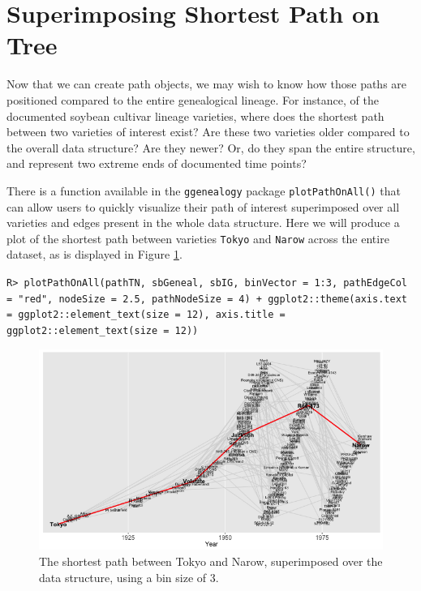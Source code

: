 \documentclass[11pt,a4paper,oldfontcommands,openany]{memoir}
\DeclareRobustCommand{\mybox}[2][gray!15]{%
\begin{tcolorbox}[   %
        breakable,
        left=0pt,
        right=0pt,
        top=0pt,
        bottom=0pt,
        colback=#1,
        colframe=#1,
        width=\dimexpr\textwidth\relax, 
        enlarge left by=0mm,
        boxsep=5pt,
        arc=0pt,outer arc=0pt,
        ]
        #2
\end{tcolorbox}
}
\numberwithin{equation}{section} %
\newcommand{\code}[1]{{\texttt{#1}}}
\newcommand{\pkg}[1]{{\texttt{#1}}}
\begin{document}
\section{Superimposing Shortest Path on Tree}

Now that we can create path objects, we may wish to know how those paths are positioned compared to the entire genealogical lineage. For instance, of the documented soybean cultivar lineage varieties, where does the shortest path between two varieties of interest exist? Are these two varieties older compared to the overall data structure? Are they newer? Or, do they span the entire structure, and represent two extreme ends of documented time points?

There is a function available in the \pkg{ggenealogy} package \code{plotPathOnAll()} that can allow users to quickly visualize their path of interest superimposed over all varieties and edges present in the whole data structure. Here we will produce a plot of the shortest path between varieties \code{Tokyo} and \code{Narow} across the entire dataset, as is displayed in Figure \ref{fig:plotTNBin3}.

\mybox{
\texttt{R> plotPathOnAll(pathTN, sbGeneal, sbIG, binVector = 1:3, pathEdgeCol = "red", nodeSize = 2.5, pathNodeSize = 4) + ggplot2::theme(axis.text = ggplot2::element\_text(size = 12), axis.title = ggplot2::element\_text(size = 12))}
}

\begin{figure}%
    \begin{framed}
    \centering
    \includegraphics[width=\textwidth]{plotTNBin3}
    \end{framed}
    \caption{The shortest path between Tokyo and Narow, superimposed over the data structure, using a bin size of 3.}
    \label{fig:plotTNBin3}
\end{figure}
\end{document}
